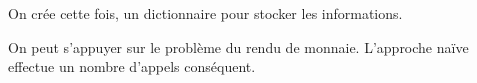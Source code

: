 \documentclass[a4paper,11pt]{article}
\begin{document}
On crée cette fois, un dictionnaire pour stocker les informations.



On peut s'appuyer sur le problème du rendu de monnaie. L'approche naïve effectue un nombre d'appels conséquent.






\end{document}
